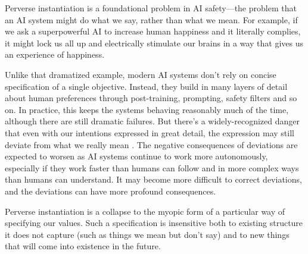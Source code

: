 \documentclass[11pt]{article}
\begin{document}
Perverse instantiation is a foundational problem in AI safety---the problem that an AI system might do what we say, rather than what we mean. For example, if we ask a superpowerful AI to increase human happiness and it literally complies, it might lock us all up and electrically stimulate our brains in a way that gives us an experience of happiness. 

Unlike that dramatized example, modern AI systems don't rely on concise specification of a single objective. Instead, they build in many layers of detail about human preferences through post-training, prompting, safety filters and so on. In practice, this keeps the systems behaving reasonably much of the time, although there are still dramatic failures. But there's a widely-recognized danger that even with our intentions expressed in great detail, the expression may still deviate from what we really mean \citep{amodei2016concrete,gabriel2020artificial,russell2019human,bostrom2014superintelligence, krakovna2020specification, grossman1986costs, hadfield2019incomplete, zhuang2020consequences, wiener1960some}. The negative consequences of deviations are expected to worsen as AI systems continue to work more autonomously, especially if they work faster than humans can follow and in more complex ways than humans can understand. It may become more difficult to correct deviations, and the deviations can have more profound consequences.

Perverse instantiation is a collapse to the myopic form of a particular way of specifying our values. Such a specification is insensitive both to existing structure it does not capture (such as things we mean but don't say) and to new things that will come into existence in the future.




\end{document}
